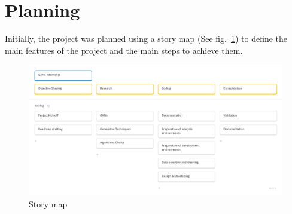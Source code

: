 \section{Planning}
Initially, the project was planned using a story map (See fig.~\ref*{label:story-map}) to define the main features of the project and the main steps to achieve them.
\begin{figure}[H]
    \centering
    \includegraphics[width=1\textwidth]{images/story-map.jpg}
    \caption{Story map}\label{label:story-map}
\end{figure}
